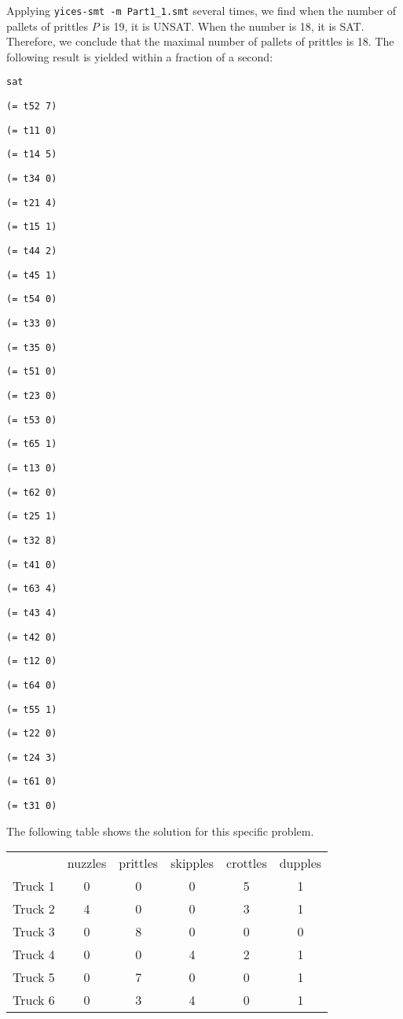 \documentclass[11pt]{article}
\begin{document}
Applying {\tt yices-smt -m Part1\_1.smt} several times, we find when the number of pallets of prittles $P$ is 19, it is UNSAT. When the number is 18, it is SAT. Therefore, we conclude that the maximal number of pallets of prittles is 18.
The following result is yielded within a fraction of a second:

{\footnotesize

{\tt sat}

{\tt (= t52 7)}

{\tt (= t11 0)}

{\tt (= t14 5)}

{\tt (= t34 0)}

{\tt (= t21 4)}

{\tt (= t15 1)}

{\tt (= t44 2)}

{\tt (= t45 1)}

{\tt (= t54 0)}

{\tt (= t33 0)}

{\tt (= t35 0)}

{\tt (= t51 0)}

{\tt (= t23 0)}

{\tt (= t53 0)}

{\tt (= t65 1)}

{\tt (= t13 0)}

{\tt (= t62 0)}

{\tt (= t25 1)}

{\tt (= t32 8)}

{\tt (= t41 0)}

{\tt (= t63 4)}

{\tt (= t43 4)}

{\tt (= t42 0)}

{\tt (= t12 0)}

{\tt (= t64 0)}

{\tt (= t55 1)}

{\tt (= t22 0)}

{\tt (= t24 3)}

{\tt (= t61 0)}

{\tt (= t31 0)}

}
\vspace{3mm}
The following table shows the solution for this specific problem.

\vspace{2mm}
  \begin{center}
  \begin{tabular}{|l|c|c|c|c|c|}
    \hline
     & nuzzles & prittles & skipples & crottles & dupples \\
    Truck 1 & 0 & 0 & 0 & 5 & 1 \\
    Truck 2 & 4 & 0 & 0 & 3 & 1 \\
    Truck 3 & 0 & 8 & 0 & 0 & 0 \\
    Truck 4 & 0 & 0 & 4 & 2 & 1 \\
    Truck 5 & 0 & 7 & 0 & 0 & 1 \\
    Truck 6 & 0 & 3 & 4 & 0 & 1 \\
    \hline
  \end{tabular}
\end{center}
\end{document}
